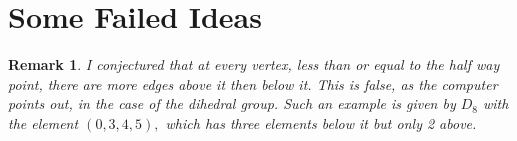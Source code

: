 \documentclass{amsart}
\newtheorem{rem}[subsubsection]{Remark}
\begin{document}
\section{Some Failed Ideas}

\begin{rem}
I conjectured that at every vertex, less than or equal to the half way point, there are more edges above it then below it. This is false, as the computer points out, in the case of the dihedral group. Such an example is given by $D_8$ with the element $(0,3,4,5),$ which has three elements below it but only 2 above.
\end{rem}
\end{document}
